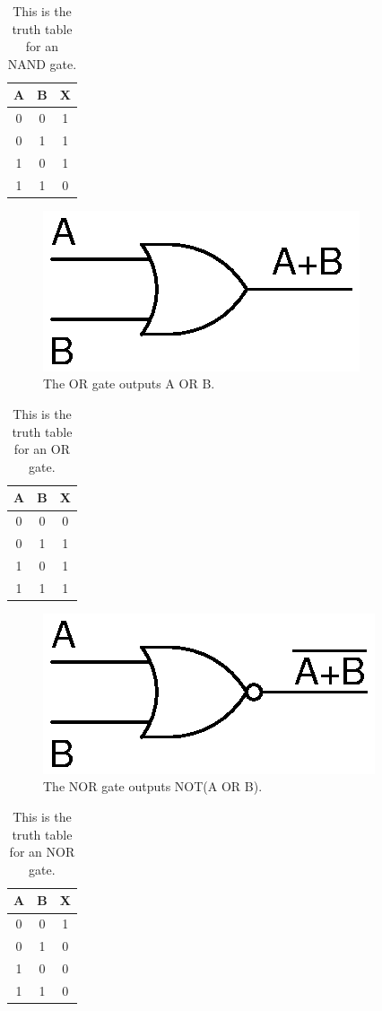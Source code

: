 \begin{table}[!ht]
	\centering
	\begin{tabular}{| c | c | c |}
		\hline
		A & B & X \\ 
		\hline
		0 & 0 & 1 \\ \hline
		0 & 1 & 1 \\ \hline
		1 & 0 & 1 \\ \hline
		1 & 1 & 0 \\ \hline
	\end{tabular}
	\caption{This is the truth table for an NAND gate.}
	\label{table:nandgate}
\end{table}

\begin{figure}[!htb]
	\centering
	\includegraphics[scale=0.7]{logic/OR.eps}
	\caption{The OR gate outputs A OR B.}
	\label{fig:orgate}
\end{figure} 

\begin{table}[!ht]
	\centering
	\begin{tabular}{| c | c | c |}
		\hline
		A & B & X \\ 
		\hline
		0 & 0 & 0 \\ \hline
		0 & 1 & 1 \\ \hline
		1 & 0 & 1 \\ \hline
		1 & 1 & 1 \\ \hline
	\end{tabular}
	\caption{This is the truth table for an OR gate.}
	\label{table:orgate}
\end{table}

\begin{figure}[!htb]
	\centering
	\includegraphics[scale=0.7]{logic/NOR.eps}
	\caption{The NOR gate outputs NOT(A OR B).}
	\label{fig:norgate}
\end{figure} 

\begin{table}[!ht]
	\centering
	\begin{tabular}{| c | c | c |}
		\hline
		A & B & X \\ 
		\hline
		0 & 0 & 1 \\ \hline
		0 & 1 & 0 \\ \hline
		1 & 0 & 0 \\ \hline
		1 & 1 & 0 \\ \hline
	\end{tabular}
	\caption{This is the truth table for an NOR gate.}
	\label{table:norgate}
\end{table}
